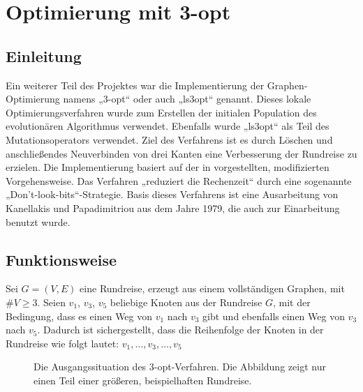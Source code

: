 \chapter{Optimierung mit 3-opt}
\section{Einleitung}
Ein weiterer Teil des Projektes war die Implementierung der
Graphen-Optimierung namens „3-opt“ oder auch „ls3opt“ genannt. Dieses lokale 
Optimierungsverfahren wurde zum Erstellen der initialen Population des 
evolutionären Algorithmus verwendet. Ebenfalls wurde „ls3opt“ als Teil
des Mutationsoperators verwendet. Ziel des Verfahrens ist es durch 
Löschen und anschließendes Neuverbinden von drei Kanten eine Verbesserung der Rundreise zu erzielen. Die Implementierung basiert auf der in
\cite{nagata} vorgestellten, modifizierten Vorgehensweise. Das Verfahren „reduziert die Rechenzeit“\cite{gapx} durch
eine sogenannte „Don't-look-bits“-Strategie. Basis dieses Verfahrens ist
eine Ausarbeitung von Kanellakis und Papadimitriou\cite{ls3opt_atsp} aus dem Jahre 1979,
die auch zur Einarbeitung benutzt wurde. 

\section{Funktionsweise}
\label{ls3opt_func}
Sei $G = (V,E)$ eine Rundreise, erzeugt aus einem vollständigen Graphen,
mit $\#V \geq 3$.
Seien $v_1$, $v_3$, $v_5$ beliebige Knoten aus der Rundreise $G$, mit
der Bedingung, dass es einen Weg von $v_1$ nach $v_3$ gibt und ebenfalls
einen Weg von $v_3$ nach $v_5$. Dadurch ist sichergestellt, dass die
Reihenfolge der Knoten in der Rundreise wie folgt lautet: $v_1, \dotsc, v_3, \dotsc, v_5$
\begin{figure}[bh]
\centering
{}
\caption[Ausgangssituation 3-opt]{Die Ausgangssituation des
3-opt-Verfahren. Die Abbildung zeigt nur einen Teil einer größeren,
  beispielhaften Rundreise.}
\end {figure}

